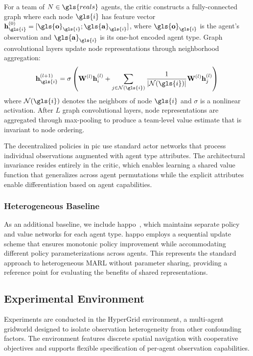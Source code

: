 For a team of \(N\in\gls{reals}\) agents, the critic constructs a 
fully-connected graph where each node \(\gls{i}\) has feature vector 
\(\mathbf{h}_{\gls{i}}^{(0)} = [\mathbf{\gls{o}}_{\gls{i}}; \mathbf{\gls{a}}_{\gls{i}}]\), 
where \(\mathbf{\gls{o}}_{\gls{i}}\) is the agent's observation and 
\(\mathbf{\gls{a}}_{\gls{i}}\) is its one-hot encoded agent type. 
Graph convolutional layers update node representations through neighborhood aggregation:
\begin{equation*}
    \mathbf{h}_{\gls{i}}^{(l+1)} 
    = \sigma\left(\mathbf{W}^{(l)}\mathbf{h}_i^{(l)} 
    + \sum_{j \in \mathcal{N}(\gls{i})} \frac{1}{|\mathcal{N}(\gls{i})|
        }\mathbf{W}^{(l)}\mathbf{h}_j^{(l)}
    \right)
\end{equation*}
where \(\mathcal{N}(\gls{i})\) denotes the neighbors of node \(\gls{i}\) and 
\(\sigma\) is a nonlinear activation. After \(L\) graph convolutional layers, 
node representations are aggregated through max-pooling to produce a 
team-level value estimate that is invariant to node ordering.

The decentralized policies in \gls{pic} use standard actor networks that process 
individual observations augmented with agent type attributes. 
The architectural invariance resides entirely in the critic,
which enables learning a shared value function that generalizes across 
agent permutations while the explicit attributes enable differentiation 
based on agent capabilities.

\subsubsection{Heterogeneous Baseline}

As an additional baseline, we include \gls{happo}~\cite{zhong2024}, 
which maintains separate policy and value networks for each agent type. 
\Gls{happo} employs a sequential update scheme that ensures monotonic policy improvement 
while accommodating different policy parameterizations across agents. 
This represents the standard approach to heterogeneous MARL without parameter sharing, 
providing a reference point for evaluating the benefits of shared representations.

\subsection{Experimental Environment}

Experiments are conducted in the HyperGrid environment, 
a multi-agent gridworld designed to isolate observation 
heterogeneity from other confounding factors.%
The environment features discrete spatial navigation with cooperative 
objectives and supports flexible specification of per-agent observation capabilities.

